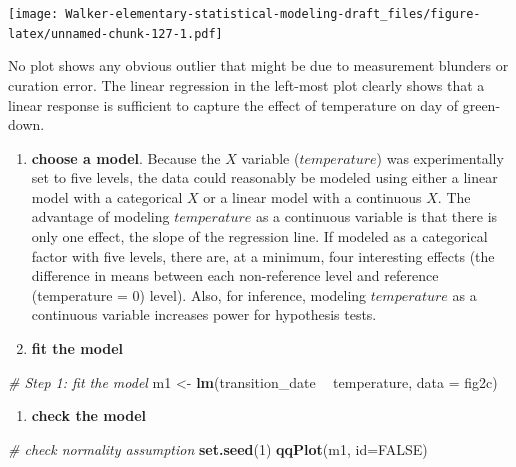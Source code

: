 \documentclass[]{book}
\newenvironment{Shaded}{\begin{snugshade}}{\end{snugshade}}
\newcommand{\CommentTok}[1]{\textcolor[rgb]{0.56,0.35,0.01}{\textit{#1}}}
\newcommand{\DataTypeTok}[1]{\textcolor[rgb]{0.13,0.29,0.53}{#1}}
\newcommand{\DecValTok}[1]{\textcolor[rgb]{0.00,0.00,0.81}{#1}}
\newcommand{\KeywordTok}[1]{\textcolor[rgb]{0.13,0.29,0.53}{\textbf{#1}}}
\newcommand{\NormalTok}[1]{#1}
\newcommand{\OperatorTok}[1]{\textcolor[rgb]{0.81,0.36,0.00}{\textbf{#1}}}
\newcommand{\OtherTok}[1]{\textcolor[rgb]{0.56,0.35,0.01}{#1}}
\newcommand{\StringTok}[1]{\textcolor[rgb]{0.31,0.60,0.02}{#1}}
\providecommand{\tightlist}{%
  \setlength{\itemsep}{0pt}\setlength{\parskip}{0pt}}
\begin{document}
\texttt{[image: Walker-elementary-statistical-modeling-draft\_files/figure-latex/unnamed-chunk-127-1.pdf]}

No plot shows any obvious outlier that might be due to measurement blunders or curation error. The linear regression in the left-most plot clearly shows that a linear response is sufficient to capture the effect of temperature on day of green-down.

\begin{enumerate}
\def\labelenumi{\arabic{enumi}.}
\setcounter{enumi}{1}
\item
  \textbf{choose a model}. Because the \(X\) variable (\(temperature\)) was experimentally set to five levels, the data could reasonably be modeled using either a linear model with a categorical \(X\) or a linear model with a continuous \(X\). The advantage of modeling \(temperature\) as a continuous variable is that there is only one effect, the slope of the regression line. If modeled as a categorical factor with five levels, there are, at a minimum, four interesting effects (the difference in means between each non-reference level and reference (temperature = 0) level). Also, for inference, modeling \(temperature\) as a continuous variable increases power for hypothesis tests.
\item
  \textbf{fit the model}
\end{enumerate}

\begin{Shaded}
\begin{Highlighting}[]
\CommentTok{# Step 1: fit the model}
\NormalTok{m1 <-}\StringTok{ }\KeywordTok{lm}\NormalTok{(transition_date }\OperatorTok{~}\StringTok{ }\NormalTok{temperature, }\DataTypeTok{data =}\NormalTok{ fig2c)}
\end{Highlighting}
\end{Shaded}

\begin{enumerate}
\def\labelenumi{\arabic{enumi}.}
\setcounter{enumi}{3}
\tightlist
\item
  \textbf{check the model}
\end{enumerate}

\begin{Shaded}
\begin{Highlighting}[]
\CommentTok{# check normality assumption}
\KeywordTok{set.seed}\NormalTok{(}\DecValTok{1}\NormalTok{)}
\KeywordTok{qqPlot}\NormalTok{(m1, }\DataTypeTok{id=}\OtherTok{FALSE}\NormalTok{)}
\end{Highlighting}
\end{Shaded}
\end{document}

